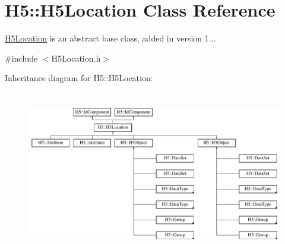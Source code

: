 \hypertarget{class_h5_1_1_h5_location}{}\section{H5\+:\+:H5\+Location Class Reference}
\label{class_h5_1_1_h5_location}


\hyperlink{class_h5_1_1_h5_location}{H5\+Location} is an abstract base class, added in version 1...  




{\ttfamily \#include $<$H5\+Location.\+h$>$}

Inheritance diagram for H5\+:\+:H5\+Location\+:\begin{figure}[H]
\begin{center}
\leavevmode
\includegraphics[height=7.304348cm]{class_h5_1_1_h5_location}
\end{center}
\end{figure}
